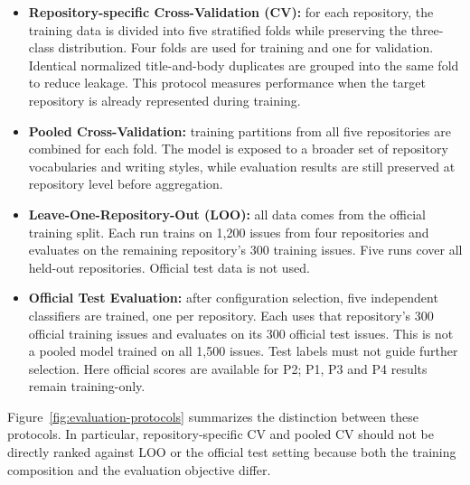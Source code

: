 \begin{itemize}[leftmargin=1.5em]
    \item \textbf{Repository-specific Cross-Validation (CV):} for each repository, the training data is divided into five stratified folds while preserving the three-class distribution. Four folds are used for training and one for validation. Identical normalized title-and-body duplicates are grouped into the same fold to reduce leakage. This protocol measures performance when the target repository is already represented during training.

    \item \textbf{Pooled Cross-Validation:} training partitions from all five repositories are combined for each fold. The model is exposed to a broader set of repository vocabularies and writing styles, while evaluation results are still preserved at repository level before aggregation.

    \item \textbf{Leave-One-Repository-Out (LOO):} all data comes from the official training split. Each run trains on 1,200 issues from four repositories and evaluates on the remaining repository's 300 training issues. Five runs cover all held-out repositories. Official test data is not used.

    \item \textbf{Official Test Evaluation:} after configuration selection, five independent classifiers are trained, one per repository. Each uses that repository's 300 official training issues and evaluates on its 300 official test issues. This is not a pooled model trained on all 1,500 issues. Test labels must not guide further selection. Here official scores are available for P2; P1, P3 and P4 results remain training-only.
\end{itemize}

Figure~\ref{fig:evaluation-protocols} summarizes the distinction between these protocols. In particular, repository-specific CV and pooled CV should not be directly ranked against LOO or the official test setting because both the training composition and the evaluation objective differ.
